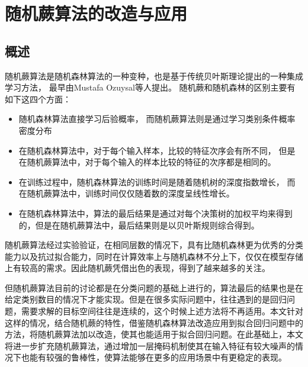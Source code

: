 \chapter{随机蕨算法的改造与应用}

\section{概述}

随机蕨算法是随机森林算法的一种变种，也是基于传统贝叶斯理论提出的一种集成学习方法，
最早由Mustafa Ozuysal等人提出\cite{ozuysal2007fast}。
随机蕨和随机森林的区别主要有如下这四个方面：
\begin{itemize}
\item
随机森林算法直接学习后验概率，
而随机蕨算法则是通过学习类别条件概率密度分布
\item
在随机森林算法中，对于每个输入样本，比较的特征次序会有所不同，
但是在随机蕨算法中，对于每个输入的样本比较的特征的次序都是相同的。
\item
在训练过程中，随机森林算法的训练时间是随着随机树的深度指数增长，
而在随机蕨算法中，训练时间仅仅随着数的深度呈线性增长。
\item
在随机森林算法中，算法的最后结果是通过对每个决策树的加权平均来得到的，但是在随机蕨算法中，最后结果则是以贝叶斯规则综合得到。
\end{itemize}
随机蕨算法经过实验验证，在相同层数的情况下，具有比随机森林更为优秀的分类能力以及抗过拟合能力，同时在计算效率上与随机森林不分上下，仅仅在模型存储上有较高的需求。因此随机蕨凭借出色的表现，得到了越来越多的关注。

但随机蕨算法目前的讨论都是在分类问题的基础上进行的，算法最后的结果也是在给定类别数目的情况下才能实现。但是在很多实际问题中，往往遇到的是回归问题，需要求解的目标空间往往是连续的，这个时候上述方法将不再适用。本文针对这样的情况，结合随机蕨的特性，借鉴随机森林算法改造应用到拟合回归问题中的方法，将随机蕨算法加以改造，使其也能适用于拟合回归问题。在此基础上，本文将进一步扩充随机蕨算法，通过增加一层掩码机制使其在输入特征有较大噪声的情况下也能有较强的鲁棒性，使算法能够在更多的应用场景中有更稳定的表现。

